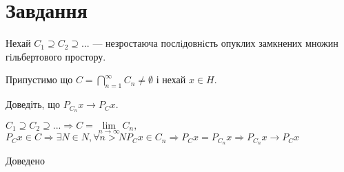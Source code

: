 

\chapter{Завдання \theHchapter}


\begin{tcolorbox}[title=Завдання]
    Нехай $C_1 \supseteq C_2 \supseteq ...$ — незростаюча послiдовнiсть
    опуклих замкнених множин гiльбертового простору.
    
    
    Припустимо що $ C = \bigcap\limits_{n=1}^{\infty}C_n \neq \emptyset $ 
    і нехай $ x \in H $.
    
    
    Доведіть, що
    $P_{C_n} x \rightarrow P_Cx$.
    
    
\end{tcolorbox}




$C_1 \supseteq C_2 \supseteq ... \Rightarrow
C = \lim\limits_{n \rightarrow\infty}C_n, $ 
$ P_Cx \in C \Rightarrow \exists N \in N, \forall n > N 
P_Cx \in C_n \Rightarrow P_Cx = P_{C_n}x 
\Rightarrow P_{C_n}x \rightarrow P_Cx$


Доведено